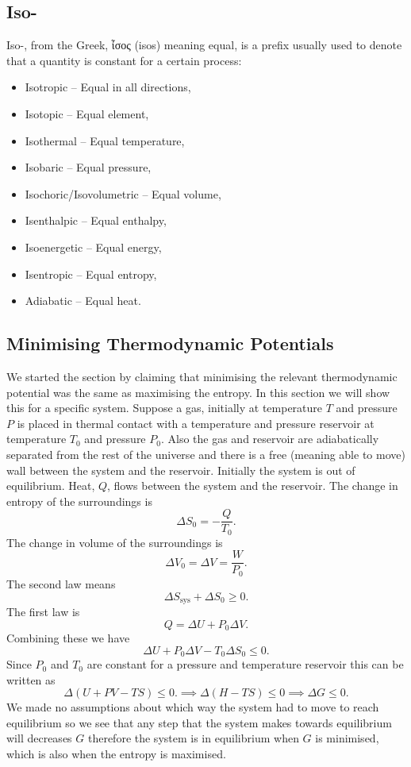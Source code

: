 \documentclass[a4paper]{article}
\newcommand{\sys}{{\mathrm{sys}}}
\begin{document}
    \subsection{Iso-}
    Iso-, from the Greek, \textgreek{ἶσος} (isos) meaning equal, is a prefix usually used to denote that a quantity is constant for a certain process:
    \begin{itemize}
        \item Isotropic -- Equal in all directions,
        \item Isotopic -- Equal element,
        \item Isothermal -- Equal temperature,
        \item Isobaric -- Equal pressure,
        \item Isochoric/Isovolumetric -- Equal volume,
        \item Isenthalpic -- Equal enthalpy,
        \item Isoenergetic -- Equal energy,
        \item Isentropic -- Equal entropy,
        \item Adiabatic -- Equal heat.
    \end{itemize}

    \subsection{Minimising Thermodynamic Potentials}
    We started the section by claiming that minimising the relevant thermodynamic potential was the same as maximising the entropy.
    In this section we will show this for a specific system.
    Suppose a gas, initially at temperature \(T\) and pressure \(P\) is placed in thermal contact with a temperature and pressure reservoir at temperature \(T_0\) and pressure \(P_0\).
    Also the gas and reservoir are adiabatically separated from the rest of the universe and there is a free (meaning able to move) wall between the system and the reservoir.
    Initially the system is out of equilibrium.
    Heat, \(Q\), flows between the system and the reservoir.
    The change in entropy of the surroundings is
    \[\Delta S_0 = -\frac{Q}{T_0}.\]
    The change in volume of the surroundings is
    \[\Delta V_0 = \Delta V = \frac{W}{P_0}.\]
    The second law means
    \[\Delta S_\sys + \Delta S_0 \ge 0.\]
    The first law is
    \[Q = \Delta U + P_0\Delta V.\]
    Combining these we have
    \[\Delta U + P_0\Delta V - T_0\Delta S_0 \le 0.\]
    Since \(P_0\) and \(T_0\) are constant for a pressure and temperature reservoir this can be written as
    \[\Delta(U + PV - TS) \le 0. \implies \Delta(H - TS) \le 0 \implies \Delta G \le 0.\]
    We made no assumptions about which way the system had to move to reach equilibrium so we see that any step that the system makes towards equilibrium will decreases \(G\) therefore the system is in equilibrium when \(G\) is minimised, which is also when the entropy is maximised.
    
\end{document}
